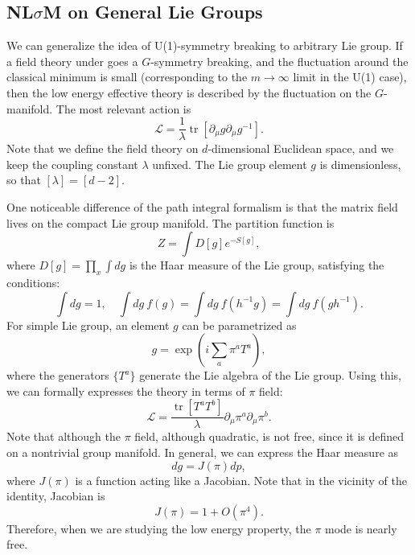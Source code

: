 \documentclass[aps,prb,superscriptaddress,nofootinbib]{revtex4}
\def \tr{\operatorname{tr}}
\begin{document}
\subsection{NL$\sigma$M on General Lie Groups}

We can generalize the idea of U(1)-symmetry breaking to arbitrary Lie group.
If a field theory under goes a $G$-symmetry breaking, and the fluctuation around the classical minimum is small (corresponding to the $m\rightarrow\infty$ limit in the U(1) case), then the low energy effective theory is described by the fluctuation on the $G$-manifold.
The most relevant action is 
\begin{equation}
	\mathcal L = \frac{1}{\lambda} \tr\left[\partial_\mu g \partial_\mu g^{-1}\right].
\end{equation}
Note that we define the field theory on $d$-dimensional Euclidean space, and we keep the coupling constant $\lambda$ unfixed.
The Lie group element $g$ is dimensionless, so that $[\lambda] = [d-2]$.

One noticeable difference of the path integral formalism is that the matrix field lives on the compact Lie group manifold.
The partition function is
\begin{equation}
	Z = \int D[g] e^{-S[g]},
\end{equation}
where $D[g]=\prod_x \int dg$ is the Haar measure of the Lie group, satisfying the conditions:
\begin{equation}
	\int dg = 1,\quad
	\int dg\ f(g) = \int dg\ f(h^{-1} g) = \int dg\ f(gh^{-1}).
\end{equation}
For simple Lie group, an element $g$ can be parametrized as
\begin{equation}
	g = \exp\left(i\sum_a \pi^a T^a\right),
\end{equation}
where the generators $\{T^a\}$ generate the Lie algebra of the Lie group.
Using this, we can formally expresses the theory in terms of $\pi$ field:
\begin{equation}
	\mathcal L = \frac{\tr[T^a T^b]}{\lambda}\partial_\mu\pi^a \partial_\mu \pi^b.
\end{equation}
Note that although the $\pi$ field, although quadratic, is not free, since it is defined on a nontrivial group manifold.
In general, we can express the Haar measure as
\begin{equation}
	dg = J(\pi) dp,
\end{equation}
where $J(\pi)$ is a function acting like a Jacobian. 
Note that in the vicinity of the identity, Jacobian is
\begin{equation}
	J(\pi) = 1 +O(\pi^4).
\end{equation}
Therefore, when we are studying the low energy property, the $\pi$ mode is nearly free.
\end{document}
